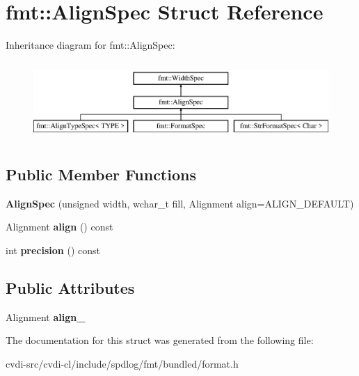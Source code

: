 \hypertarget{structfmt_1_1AlignSpec}{}\section{fmt\+:\+:Align\+Spec Struct Reference}
\label{structfmt_1_1AlignSpec}
Inheritance diagram for fmt\+:\+:Align\+Spec\+:\begin{figure}[H]
\begin{center}
\leavevmode
\includegraphics[height=3.000000cm]{structfmt_1_1AlignSpec}
\end{center}
\end{figure}
\subsection*{Public Member Functions}
\begin{DoxyCompactItemize}
\item 
{\bfseries Align\+Spec} (unsigned width, wchar\+\_\+t fill, Alignment align=A\+L\+I\+G\+N\+\_\+\+D\+E\+F\+A\+U\+LT)\hypertarget{structfmt_1_1AlignSpec_a7912b22ed62be96be0b9088b629f728c}{}\label{structfmt_1_1AlignSpec_a7912b22ed62be96be0b9088b629f728c}

\item 
Alignment {\bfseries align} () const \hypertarget{structfmt_1_1AlignSpec_abd14faffccf107e6e01bbd014e69262c}{}\label{structfmt_1_1AlignSpec_abd14faffccf107e6e01bbd014e69262c}

\item 
int {\bfseries precision} () const \hypertarget{structfmt_1_1AlignSpec_acdcb20e3a29b69355825ece5886db27b}{}\label{structfmt_1_1AlignSpec_acdcb20e3a29b69355825ece5886db27b}

\end{DoxyCompactItemize}
\subsection*{Public Attributes}
\begin{DoxyCompactItemize}
\item 
Alignment {\bfseries align\+\_\+}\hypertarget{structfmt_1_1AlignSpec_aac93fb3829d550af86479f1ecaa73f95}{}\label{structfmt_1_1AlignSpec_aac93fb3829d550af86479f1ecaa73f95}

\end{DoxyCompactItemize}


The documentation for this struct was generated from the following file\+:\begin{DoxyCompactItemize}
\item 
cvdi-\/src/cvdi-\/cl/include/spdlog/fmt/bundled/format.\+h\end{DoxyCompactItemize}
